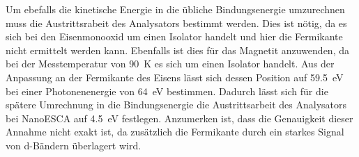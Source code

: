         Um ebefalls die kinetische Energie in die übliche Bindungsenergie umzurechnen muss die Austrittsrabeit des Analysators bestimmt werden.
        Dies ist nötig, da es sich bei den Eisenmonooxid um einen Isolator handelt und hier die Fermikante nicht ermittelt werden kann.
        Ebenfalls ist dies für das Magnetit anzuwenden, da bei der Messtemperatur von \SI{90}{\kelvin} es sich um einen Isolator handelt.
        Aus der Anpassung an der Fermikante des Eisens lässt sich dessen Position auf \SI{59.5}{\electronvolt} bei einer Photonenenergie von \SI{64}{\electronvolt} bestimmen.
        Dadurch lässt sich für die spätere Umrechnung in die Bindungsenergie die Austrittsarbeit des Analysators bei NanoESCA auf \SI{4.5}{\electronvolt} festlegen. 
        Anzumerken ist, dass die Genauigkeit dieser Annahme nicht exakt ist, da zusätzlich die Fermikante durch ein starkes Signal von d-Bändern überlagert wird.
        
